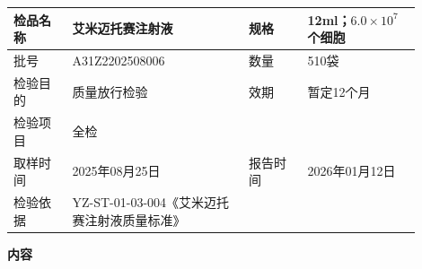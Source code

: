 \documentclass[UTF8,10pt,a4paper,fontset=fandol]{ctexart}
\newcommand{\fieldvalue}[1]{#1}
\begin{document}
\begin{tabular}{|p{0.13\linewidth}|p{0.39\linewidth}|p{0.13\linewidth}|p{0.25\linewidth}|}
\hline
检品名称 &
\fieldvalue{艾米迈托赛注射液} &
规格 &
\fieldvalue{12ml；$6.0\times10^7$个细胞}
\\ \hline
批号 &
\fieldvalue{A31Z2202508006} &
数量 &
\fieldvalue{510袋}
\\ \hline
检验目的 &
\fieldvalue{质量放行检验} &
效期 &
\fieldvalue{暂定12个月}
\\ \hline
检验项目 &
\fieldvalue{全检} &
\multicolumn{2}{l|}{}
\\ \hline
取样时间 &
\fieldvalue{2025年08月25日} &
报告时间 &
\fieldvalue{2026年01月12日}
\\ \hline
检验依据 &
\fieldvalue{YZ-ST-01-03-004《艾米迈托赛注射液质量标准》} &
\multicolumn{2}{l|}{}
\\ \hline
\end{tabular}

\begin{center}
\textbf{内\quad 容}
\end{center}
\end{document}
